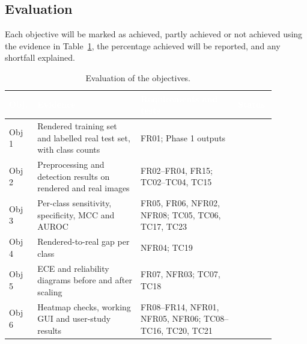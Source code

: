\subsection{Evaluation}
\label{sec:eval}

Each objective will be marked as achieved, partly achieved or not achieved using the evidence in Table~\ref{tab:obj-eval}, the percentage achieved will be reported, and any shortfall explained.

\begin{table}[H]
  \centering
  \footnotesize
  \setlength{\arrayrulewidth}{0.8pt}
  \renewcommand{\arraystretch}{1.12}
  \caption{Evaluation of the objectives.}
  \label{tab:obj-eval}
  \begin{tabular}{|p{0.07\linewidth}|p{0.36\linewidth}|p{0.34\linewidth}|p{0.11\linewidth}|}
    \hline
    \rowcolor{cyan!90!black}
    \textcolor{white}{\textbf{Obj.}} & \textcolor{white}{\textbf{Evidence}} &
    \textcolor{white}{\textbf{Requirements and tests}} & \textcolor{white}{\textbf{Status}} \\
    \hline
    Obj 1 & Rendered training set and labelled real test set, with class counts & FR01; Phase 1 outputs & \\
    \hline
    Obj 2 & Preprocessing and detection results on rendered and real images & FR02--FR04, FR15; TC02--TC04, TC15 & \\
    \hline
    Obj 3 & Per-class sensitivity, specificity, MCC and AUROC & FR05, FR06, NFR02, NFR08; TC05, TC06, TC17, TC23 & \\
    \hline
    Obj 4 & Rendered-to-real gap per class & NFR04; TC19 & \\
    \hline
    Obj 5 & ECE and reliability diagrams before and after scaling & FR07, NFR03; TC07, TC18 & \\
    \hline
    Obj 6 & Heatmap checks, working GUI and user-study results & FR08--FR14, NFR01, NFR05, NFR06; TC08--TC16, TC20, TC21 & \\
    \hline
  \end{tabular}
\end{table}

